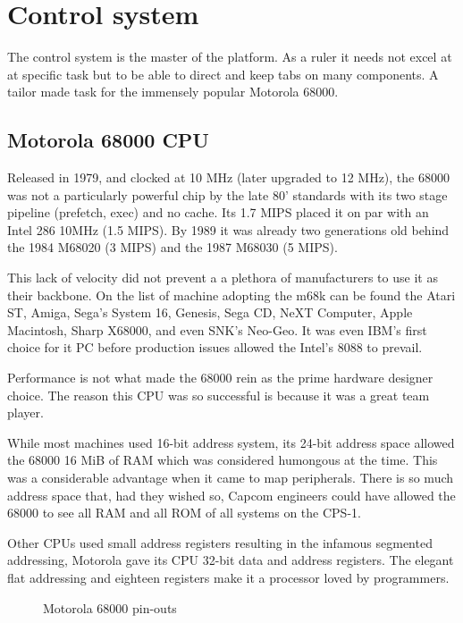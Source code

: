 \section{Control system}
The control system is the master of the platform. As a ruler it needs not excel at at specific task but to be able to direct and keep tabs on many components. A tailor made task for the immensely popular Motorola 68000.


\subsection{Motorola 68000 CPU}

 Released in 1979, and clocked at 10 MHz (later upgraded to 12 MHz), the 68000 was not a particularly powerful chip by the late 80' standards with its two stage pipeline\cite{M68000fv} (prefetch, exec) and no cache. Its 1.7 MIPS placed it on par with an Intel 286 10MHz (1.5 MIPS). By 1989 it was already two generations old behind the 1984 M68020 (3 MIPS) and the 1987 M68030 (5 MIPS)\cite{mips}.


This lack of velocity did not prevent a a plethora of manufacturers to use it as their backbone. On the list of machine adopting the m68k can be found the Atari ST, Amiga, Sega's System 16, Genesis, Sega CD, NeXT Computer, Apple Macintosh, Sharp X68000, and even SNK's Neo-Geo. It was even IBM's first choice for it PC before production issues allowed the Intel's 8088 to prevail\cite{ieee20170630}. 

Performance is not what made the 68000 rein as the prime hardware designer choice. The reason this CPU was so successful is because it was a great team player.

While most machines used 16-bit address system, its 24-bit address space allowed the 68000 16 MiB of RAM which was considered humongous at the time. This was a considerable advantage when it came to map peripherals. There is so much address space that, had they wished so, Capcom engineers could have allowed the 68000 to see all RAM and all ROM of all systems on the CPS-1.

Other CPUs used small address registers resulting in the infamous segmented addressing, Motorola gave its CPU 32-bit data and address registers. The elegant flat addressing and eighteen registers make it a processor loved by programmers. 


\begin{figure}[H]

 
 \caption*{Motorola 68000 pin-outs}
\label{68000drawing}
  \end{figure}



